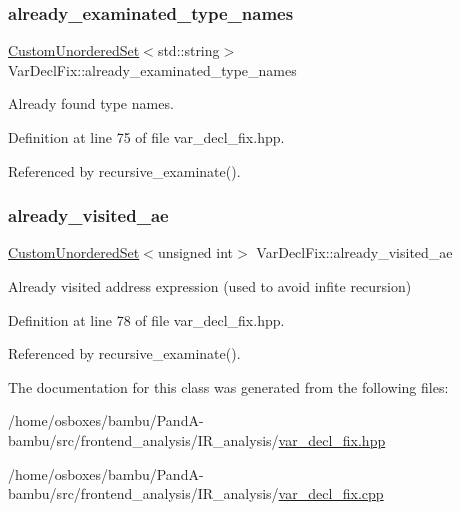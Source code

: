 \subsubsection{\texorpdfstring{already\+\_\+examinated\+\_\+type\+\_\+names}{already\_examinated\_type\_names}}
{\footnotesize\ttfamily \hyperlink{classCustomUnorderedSet}{Custom\+Unordered\+Set}$<$std\+::string$>$ Var\+Decl\+Fix\+::already\+\_\+examinated\+\_\+type\+\_\+names\hspace{0.3cm}{\ttfamily [protected]}}



Already found type names. 



Definition at line 75 of file var\+\_\+decl\+\_\+fix.\+hpp.



Referenced by recursive\+\_\+examinate().

\mbox{\label{classVarDeclFix_a17a0e73aeb82b6490d4654ecc3b28f5e}} 
\subsubsection{\texorpdfstring{already\+\_\+visited\+\_\+ae}{already\_visited\_ae}}
{\footnotesize\ttfamily \hyperlink{classCustomUnorderedSet}{Custom\+Unordered\+Set}$<$unsigned int$>$ Var\+Decl\+Fix\+::already\+\_\+visited\+\_\+ae\hspace{0.3cm}{\ttfamily [protected]}}



Already visited address expression (used to avoid infite recursion) 



Definition at line 78 of file var\+\_\+decl\+\_\+fix.\+hpp.



Referenced by recursive\+\_\+examinate().



The documentation for this class was generated from the following files\+:\begin{DoxyCompactItemize}
\item 
/home/osboxes/bambu/\+Pand\+A-\/bambu/src/frontend\+\_\+analysis/\+I\+R\+\_\+analysis/\hyperlink{var__decl__fix_8hpp}{var\+\_\+decl\+\_\+fix.\+hpp}\item 
/home/osboxes/bambu/\+Pand\+A-\/bambu/src/frontend\+\_\+analysis/\+I\+R\+\_\+analysis/\hyperlink{var__decl__fix_8cpp}{var\+\_\+decl\+\_\+fix.\+cpp}\end{DoxyCompactItemize}
